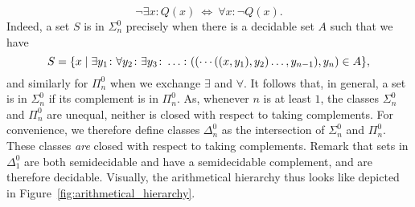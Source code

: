 \begin{equation*}
  \lnot \exists x\colon Q(x) \:\iff\: \forall x\colon \lnot Q(x).
\end{equation*}
Indeed, a set $S$ is in $\Sigma^0_n$ precisely when there is a decidable set $A$ such that we have
\begin{equation}
\label{eq:arithmetical_hierarchy}
  S = \{x \;|\; \exists y_1\colon \forall y_2\colon\exists y_3\colon \ldots\colon ((\cdots((x, y_1), y_2)\ldots, y_{n-1}), y_n) \in A\},
\end{equation}
and similarly for $\Pi^0_n$ when we exchange $\exists$ and $\forall$.
It follows that, in general, a set is in $\Sigma^0_n$ if its complement is in $\Pi^0_n$.
As, whenever $n$ is at least $1$, the classes $\Sigma^0_n$ and $\Pi^0_n$ are unequal, neither is closed with respect to taking complements.
For convenience, we therefore define classes $\Delta^0_n$ as the intersection of $\Sigma^0_n$ and $\Pi^0_n$.
These classes \emph{are} closed with respect to taking complements.
Remark that sets in $\Delta^0_1$ are both semidecidable and have a semidecidable complement, and are therefore decidable.
Visually, the arithmetical hierarchy thus looks like depicted in Figure~\ref{fig:arithmetical_hierarchy}.
